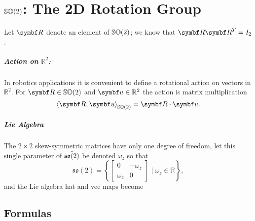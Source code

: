 \chapter{\texorpdfstring{${\mathbb{SO}(2)}$}{SO(2)}: The 2D Rotation Group}

Let $\bR$ denote an element of ${\mathbb{SO}(2)}$; we know that $\bR \bR^{T} = I_{2}$.

\paragraph{Action on $\mathbb{R}^2$:}
In robotics applications it is convenient to define a rotational action on vectors in $\mathbb{R}^2$. For $\bR \in \SOtwo$ and $\bu \in \mathbb{R}^2$ the action is matrix multiplication
\begin{equation}
  \left \langle \bR, \bu \right \rangle_{\SOtwo} = \bR \cdot \bu.
\end{equation}

\paragraph{Lie Algebra}

The $2 \times 2$ skew-symmetric matrices have only one degree of freedom, let this single parameter of $\check{{\mathfrak{so}(2)}}$ be denoted $\omega_z$ so that
\begin{equation}
  \mathfrak{so}(2) = \left\{ \begin{bmatrix} 0 & -\omega_z \\ \omega_z & 0 \end{bmatrix} \mid \omega_z \in \mathbb{R} \right\},
\end{equation}
and the Lie algebra hat and vee maps become
\begin{center}
\end{center}
\section{Formulas}

